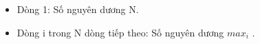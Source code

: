 \begin{itemize}
	\item     Dòng 1: Số nguyên dương N.   
	\item     Dòng i trong N dòng tiếp theo: Số nguyên dương $max_{i}$    .   
\end{itemize}
